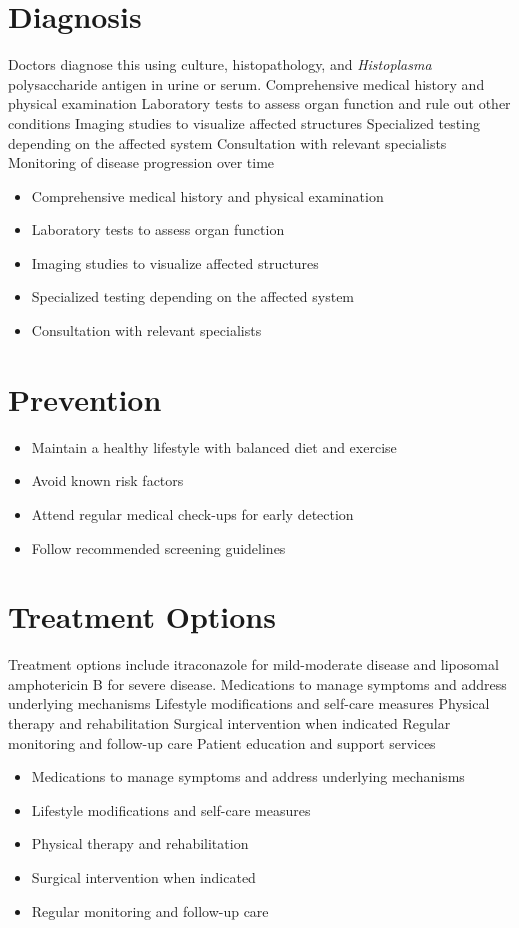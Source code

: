 \section{Diagnosis}
Doctors diagnose this using culture, histopathology, and \textit{Histoplasma} polysaccharide antigen in urine or serum. Comprehensive medical history and physical examination Laboratory tests to assess organ function and rule out other conditions Imaging studies to visualize affected structures Specialized testing depending on the affected system Consultation with relevant specialists Monitoring of disease progression over time

\begin{itemize}[noitemsep]
  \item Comprehensive medical history and physical examination
  \item Laboratory tests to assess organ function
  \item Imaging studies to visualize affected structures
  \item Specialized testing depending on the affected system
  \item Consultation with relevant specialists
\end{itemize}
\section{Prevention}
\begin{itemize}[noitemsep]
  \item Maintain a healthy lifestyle with balanced diet and exercise
  \item Avoid known risk factors
  \item Attend regular medical check-ups for early detection
  \item Follow recommended screening guidelines
\end{itemize}
\section{Treatment Options}
Treatment options include itraconazole for mild-moderate disease and liposomal amphotericin B for severe disease. Medications to manage symptoms and address underlying mechanisms Lifestyle modifications and self-care measures Physical therapy and rehabilitation Surgical intervention when indicated Regular monitoring and follow-up care Patient education and support services

\begin{itemize}[noitemsep]
  \item Medications to manage symptoms and address underlying mechanisms
  \item Lifestyle modifications and self-care measures
  \item Physical therapy and rehabilitation
  \item Surgical intervention when indicated
  \item Regular monitoring and follow-up care
\end{itemize}
